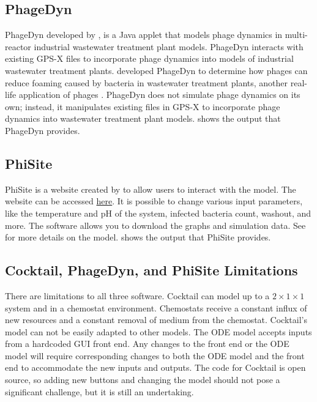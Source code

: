 \subsection{PhageDyn}
PhageDyn developed by \cite{krysiak-baltynSimulationPhageDynamics2017}, is a Java applet that models phage dynamics in multi-reactor industrial wastewater treatment plant models. 
PhageDyn interacts with existing GPS-X \cite{AdvancedWastewaterModelling} files to incorporate phage dynamics into models of industrial wastewater treatment plants. 
\citet{krysiak-baltynSimulationPhageDynamics2017} developed PhageDyn to determine how phages can reduce foaming caused by bacteria in wastewater treatment plants, another real-life application of phages \cite{heardEffectFilamentousBacteria2008}. 
PhageDyn does not simulate phage dynamics on its own; instead, it manipulates existing files in GPS-X to incorporate phage dynamics into wastewater treatment plant models. 
 shows the output that PhageDyn provides. 

\subsection{PhiSite}
PhiSite is a website created by \citet{bekeModellingInteractionBacteriophages2016} to allow users to interact with the \citet{schragHostParasiteCoexistenceRole1996} model. 
The website can be accessed \href{http://dublin.embnet.sk:3838/model/}{here}. 
It is possible to change various input parameters, like the temperature and pH of the system, infected bacteria count, washout, and more. 
The software allows you to download the graphs and simulation data. 
See  for more details on the model. 
 shows the output that PhiSite provides. 

\subsection{Cocktail, PhageDyn, and PhiSite Limitations}
\label{sec:literature:cocktail_and_phagedyn_limitations}
There are limitations to all three software. 
Cocktail can model up to a $2\times 1 \times 1$ system and in a chemostat environment. 
Chemostats receive a constant influx of new resources and a constant removal of medium from the chemostat. 
Cocktail's model can not be easily adapted to other models. 
The ODE model accepts inputs from a hardcoded GUI front end. 
Any changes to the front end or the ODE model will require corresponding changes to both the ODE model and the front end to accommodate the new inputs and outputs. 
The code for Cocktail is open source, so adding new buttons and changing the model should not pose a significant challenge, but it is still an undertaking. 


